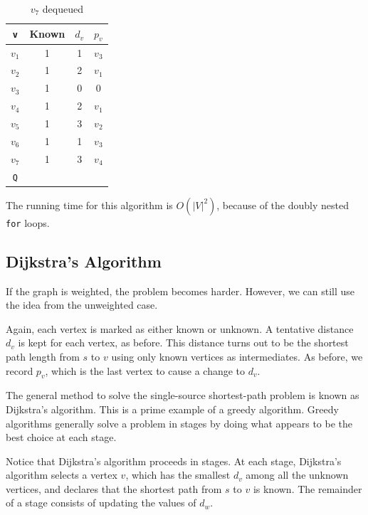 \begin{minipage}{0.33\textwidth}
  \begin{table}[H]
    \centering
    \begin{tabular}{c|c|c|c}
        \toprule
        \verb|v| & Known & \(d_v\) & \(p_v\)  \\
      \midrule
        \(v_1\) & 1 & 1 & \(v_3\)  \\
        \(v_2\) & 1 & 2 & \(v_1\)  \\
        \(v_3\) & 1 & 0 & 0  \\
        \(v_4\) & 1 & 2 & \(v_1\)  \\
        \(v_5\) & 1 & 3 & \(v_2\)   \\
        \(v_6\) & 1 & 1 & \(v_3\)  \\
        \(v_7\) & 1 & 3 & \(v_4\)  \\
      \midrule
        \verb|Q| & \multicolumn{3}{c}{} \\
      \bottomrule
    \end{tabular}
    \caption*{\(v_7\) dequeued}
  \end{table}
\end{minipage}

The running time for this algorithm is \(O(\vert V \vert^2)\), because of the doubly nested \texttt{for} loops.

\subsection{Dijkstra's Algorithm}
If the graph is weighted, the problem becomes harder. However, we can still use the idea from the unweighted case.

Again, each vertex is marked as either known or unknown. A tentative distance \(d_v\) is kept for each vertex, as before. This distance turns out to be the shortest path length from \(s\) to \(v\) using only known vertices as intermediates. As before, we record \(p_v\), which is the last vertex to cause a change to \(d_v\).

The general method to solve the single-source shortest-path problem is known as Dijkstra's algorithm. This is a prime example of a greedy algorithm. Greedy algorithms generally solve a problem in stages by doing what appears to be the best choice at each stage.

Notice that Dijkstra's algorithm proceeds in stages. At each stage, Dijkstra's algorithm selects a vertex \(v\), which has the smallest \(d_v\) among all the unknown vertices, and declares that the shortest path from \(s\) to \(v\) is known. The remainder of a stage consists of updating the values of \(d_w\).

